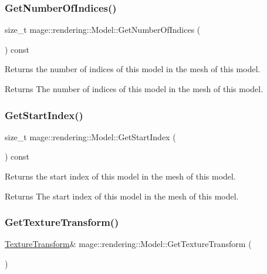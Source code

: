 \subsubsection{\texorpdfstring{Get\+Number\+Of\+Indices()}{GetNumberOfIndices()}}
{\footnotesize\ttfamily size\+\_\+t mage\+::rendering\+::\+Model\+::\+Get\+Number\+Of\+Indices (\begin{DoxyParamCaption}{ }\end{DoxyParamCaption}) const\hspace{0.3cm}{\ttfamily [noexcept]}}

Returns the number of indices of this model in the mesh of this model.

\begin{DoxyReturn}{Returns}
The number of indices of this model in the mesh of this model. 
\end{DoxyReturn}
\hypertarget{classmage_1_1rendering_1_1_model_a2944b26434496b580bbbebbccd592ee3}{}\label{classmage_1_1rendering_1_1_model_a2944b26434496b580bbbebbccd592ee3} 
\subsubsection{\texorpdfstring{Get\+Start\+Index()}{GetStartIndex()}}
{\footnotesize\ttfamily size\+\_\+t mage\+::rendering\+::\+Model\+::\+Get\+Start\+Index (\begin{DoxyParamCaption}{ }\end{DoxyParamCaption}) const\hspace{0.3cm}{\ttfamily [noexcept]}}

Returns the start index of this model in the mesh of this model.

\begin{DoxyReturn}{Returns}
The start index of this model in the mesh of this model. 
\end{DoxyReturn}
\hypertarget{classmage_1_1rendering_1_1_model_a57e4069226ce9bade50bc17503378f08}{}\label{classmage_1_1rendering_1_1_model_a57e4069226ce9bade50bc17503378f08} 
\subsubsection{\texorpdfstring{Get\+Texture\+Transform()}{GetTextureTransform()}\hspace{0.1cm}{\footnotesize\ttfamily [1/2]}}
{\footnotesize\ttfamily \hyperlink{classmage_1_1_texture_transform}{Texture\+Transform}\& mage\+::rendering\+::\+Model\+::\+Get\+Texture\+Transform (\begin{DoxyParamCaption}{ }\end{DoxyParamCaption})\hspace{0.3cm}{\ttfamily [noexcept]}}

